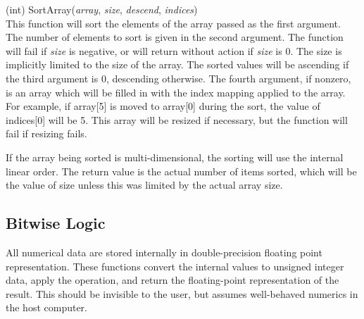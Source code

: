 \begin{description}
\item{(int) \vt SortArray({\it array}, {\it size}, {\it descend},
  {\it indices\/})}\\
This function will sort the elements of the array passed as the first
argument.  The number of elements to sort is given in the second
argument.  The function will fail if {\it size} is negative, or will
return without action if {\it size} is 0.  The size is implicitly
limited to the size of the array.  The sorted values will be ascending
if the third argument is 0, descending otherwise.  The fourth
argument, if nonzero, is an array which will be filled in with the
index mapping applied to the array.  For example, if array[5] is moved
to array[0] during the sort, the value of indices[0] will be 5.  This
array will be resized if necessary, but the function will fail if
resizing fails.
    
If the array being sorted is multi-dimensional, the sorting will use
the internal linear order.  The return value is the actual number of
items sorted, which will be the value of size unless this was limited
by the actual array size.

\end{description}


\subsection{Bitwise Logic}

All numerical data are stored internally in double-precision floating
point representation.  These functions convert the internal values to
unsigned integer data, apply the operation, and return the
floating-point representation of the result.  This should be invisible
to the user, but assumes well-behaved numerics in the host computer.

